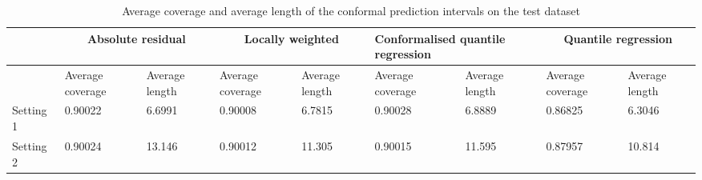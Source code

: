 \documentclass[11pt, titlepage]{article} %
\numberwithin{equation}{section}
\theoremstyle{definition}
\numberwithin{theorem}{section}
\numberwithin{lemma}{section}
\numberwithin{corollary}{section}
\numberwithin{proposition}{section}
\numberwithin{definition}{section}
\numberwithin{remark}{section}
\begin{document}
\begin{table}[H]
    \centering
    \renewcommand{\arraystretch}{1.2}
    \begin{tabular}{|p{1.2cm}|p{1.5cm}|p{1.5cm}|p{1.5cm}|p{1.5cm}|p{1.5cm}|p{1.5cm}|p{1.5cm}|p{1.5cm}|}
        \hline
        & \multicolumn{2}{c|}{Absolute residual} & \multicolumn{2}{c|}{Locally weighted} & \multicolumn{2}{p{3.5cm}|}{Conformalised quantile regression} & \multicolumn{2}{c|}{Quantile regression} \\
        \hline
        & Average coverage & Average length & Average coverage & Average length & Average coverage & Average length & Average coverage & Average length\\
        \hline
        Setting 1 & 0.90022 & 6.6991 & 0.90008 & 6.7815 & 0.90028 & 6.8889 & 0.86825 & 6.3046 \\
        \hline
        Setting 2 & 0.90024 & 13.146 & 0.90012 & 11.305 & 0.90015 & 11.595 & 0.87957 & 10.814 \\
        \hline
    \end{tabular}
    \caption{Average coverage and average length of the conformal prediction intervals on the test dataset}
    \label{tab:2_4_settings1_2_results}
\end{table}
\end{document}
